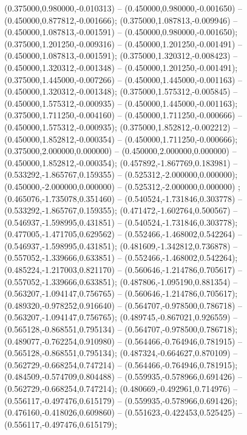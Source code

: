 (0.375000,0.980000,-0.010313) -- (0.450000,0.980000,-0.001650) -- (0.450000,0.877812,-0.001666);
 (0.375000,1.087813,-0.009946) -- (0.450000,1.087813,-0.001591) -- (0.450000,0.980000,-0.001650);
 (0.375000,1.201250,-0.009316) -- (0.450000,1.201250,-0.001491) -- (0.450000,1.087813,-0.001591);
 (0.375000,1.320312,-0.008423) -- (0.450000,1.320312,-0.001348) -- (0.450000,1.201250,-0.001491);
 (0.375000,1.445000,-0.007266) -- (0.450000,1.445000,-0.001163) -- (0.450000,1.320312,-0.001348);
 (0.375000,1.575312,-0.005845) -- (0.450000,1.575312,-0.000935) -- (0.450000,1.445000,-0.001163);
 (0.375000,1.711250,-0.004160) -- (0.450000,1.711250,-0.000666) -- (0.450000,1.575312,-0.000935);
 (0.375000,1.852812,-0.002212) -- (0.450000,1.852812,-0.000354) -- (0.450000,1.711250,-0.000666);
 (0.375000,2.000000,0.000000) -- (0.450000,2.000000,0.000000) -- (0.450000,1.852812,-0.000354);
 (0.457892,-1.867769,0.183981) -- (0.533292,-1.865767,0.159355) -- (0.525312,-2.000000,0.000000);
 (0.450000,-2.000000,0.000000) -- (0.525312,-2.000000,0.000000) ;
 (0.465076,-1.735078,0.351460) -- (0.540524,-1.731846,0.303778) -- (0.533292,-1.865767,0.159355);
 (0.471472,-1.602764,0.500567) -- (0.546937,-1.598995,0.431851) -- (0.540524,-1.731846,0.303778);
 (0.477005,-1.471705,0.629562) -- (0.552466,-1.468002,0.542264) -- (0.546937,-1.598995,0.431851);
 (0.481609,-1.342812,0.736878) -- (0.557052,-1.339666,0.633851) -- (0.552466,-1.468002,0.542264);
 (0.485224,-1.217003,0.821170) -- (0.560646,-1.214786,0.705617) -- (0.557052,-1.339666,0.633851);
 (0.487806,-1.095190,0.881354) -- (0.563207,-1.094147,0.756765) -- (0.560646,-1.214786,0.705617);
 (0.489320,-0.978252,0.916640) -- (0.564707,-0.978500,0.786718) -- (0.563207,-1.094147,0.756765);
 (0.489745,-0.867021,0.926559) -- (0.565128,-0.868551,0.795134) -- (0.564707,-0.978500,0.786718);
 (0.489077,-0.762254,0.910980) -- (0.564466,-0.764946,0.781915) -- (0.565128,-0.868551,0.795134);
 (0.487324,-0.664627,0.870109) -- (0.562729,-0.668254,0.747214) -- (0.564466,-0.764946,0.781915);
 (0.484509,-0.574709,0.804488) -- (0.559935,-0.578966,0.691426) -- (0.562729,-0.668254,0.747214);
 (0.480669,-0.492961,0.714976) -- (0.556117,-0.497476,0.615179) -- (0.559935,-0.578966,0.691426);
 (0.476160,-0.418026,0.609860) -- (0.551623,-0.422453,0.525425) -- (0.556117,-0.497476,0.615179);
